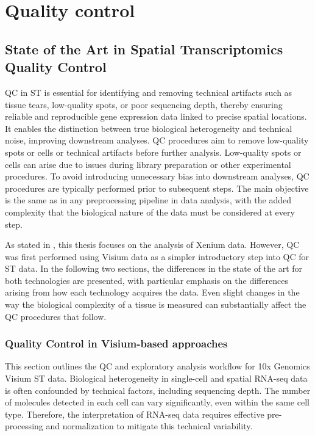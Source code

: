\setchapterpreamble[u]{}
\chapter{Quality control}

\section{State of the Art in Spatial Transcriptomics Quality Control}

QC in ST is essential for identifying and removing technical artifacts such as tissue tears, low-quality spots, or poor sequencing depth, thereby ensuring reliable and reproducible gene expression data linked to precise spatial locations. It enables the distinction between true biological heterogeneity and technical noise, improving downstream analyses. QC procedures aim to remove low-quality spots or cells  or technical artifacts before further analysis. Low-quality spots or cells can arise due to issues during library preparation or other experimental procedures. To avoid introducing unnecessary bias into downstream analyses, QC procedures are typically performed prior to subsequent steps. The main objective is the same as in any preprocessing pipeline in data analysis, with the added complexity that the biological nature of the data must be considered at every step.

As stated in , this thesis focuses on the analysis of Xenium data. However, QC was first performed using Visium data as a simpler introductory step into QC for ST data. In the following two sections, the differences in the state of the art for both technologies are presented, with particular emphasis on the differences arising from how each technology acquires the data. Even slight changes in the way the biological complexity of a tissue is measured can substantially affect the QC procedures that follow.

\subsection{Quality Control in Visium-based approaches}

This section outlines the QC and exploratory analysis workflow for 10x Genomics Visium ST data. Biological heterogeneity in single-cell and spatial RNA-seq data is often confounded by technical factors, including sequencing depth. The number of molecules detected in each cell can vary significantly, even within the same cell type. Therefore, the interpretation of RNA-seq data requires effective pre-processing and normalization to mitigate this technical variability.

